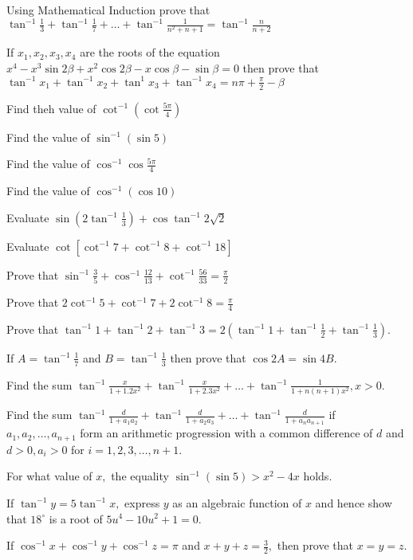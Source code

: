 \item Using Mathematical Induction prove that $\tan^{-1}\frac{1}{3} + \tan^{-1}\frac{1}{7} + \ldots + \tan^{-1}\frac{1}{n^2 + n
    + 1} = \tan^{-1}\frac{n}{n + 2}$
\item If $x_1, x_2, x_3, x_4$ are the roots of the equation $x^4 - x^3\sin2\beta + x^2\cos2\beta - x\cos\beta - \sin\beta
    = 0$ then prove that $\tan^{-1}x_1 + \tan^{-1}x_2 + \tan^{1}x_3 + \tan^{-1}x_4 = n\pi + \frac{\pi}{2} - \beta$
\item Find theh value of $\cot^{-1}\left(\cot \frac{5\pi}{4}\right)$
\item Find the value of $\sin^{-1}(\sin 5)$
\item Find the value of $\cos^{-1}\cos\frac{5\pi}{4}$
\item Find the value of $\cos^{-1}(\cos 10)$
\item Evaluate $\sin\left(2\tan^{-1}\frac{1}{3}\right) + \cos\tan^{-1}2\sqrt{2}$
\item Evaluate $\cot[\cot^{-1}7 + \cot^{-1}8 + \cot^{-1}18]$
\item Prove that $\sin^{-1}\frac{3}{5} + \cos^{-1}\frac{12}{13} + \cot^{-1}\frac{56}{33} = \frac{\pi}{2}$
\item Prove that $2\cot^{-1}5 + \cot^{-1}7 + 2\cot^{-1}8 = \frac{\pi}{4}$
\item Prove that $\tan^{-1}1 + \tan^{-1}2 + \tan^{-1}3 = 2\left(\tan^{-1}1 + \tan^{-1}\frac{1}{2} +
    \tan^{-1}\frac{1}{3}\right).$
\item If $A = \tan^{-1}\frac{1}{7}$ and $B = \tan^{-1}\frac{1}{3}$ then prove that $\cos 2A = \sin 4B.$
\item Find the sum $\tan^{-1}\frac{x}{1 + 1.2x^2} + \tan^{-1}\frac{x}{1 + 2.3x^2} + \ldots + \tan^{-1}\frac{1}{1 + n(n +
    1)x^2}, x> 0.$
\item Find the sum $\tan^{-1}\frac{d}{1 + a_1a_2} + \tan^{-1}\frac{d}{1 + a_2a_3} + \ldots + \tan^{-1}\frac{d}{1 + a_na_{n +
     1}}$ if $a_1, a_2, \ldots, a_{n + 1}$ form an arithmetic progression with a common difference of $d$ and $d
     > 0, a_i>0$ for $i = 1,2,3,\ldots, n + 1.$
\item For what value of $x,$ the equality $\sin^{-1}(\sin 5) > x^2 - 4x$ holds.
\item If $\tan^{-1}y = 5\tan^{-1}x,$ express $y$ as an algebraic function of $x$ and hence show that
     $18^\circ$ is a root of $5u^4 - 10u^2 + 1 = 0.$
\item If $\cos^{-1}x + \cos^{-1}y + \cos^{-1}z = \pi$ and $x + y + z = \frac{3}{2},$ then prove that $x = y = z.$

